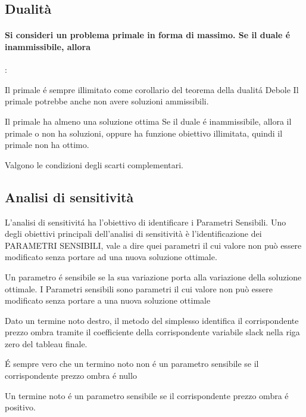 \documentclass[12pt, a4paper, openany]{book}
\begin{document}
\subsection{Dualità}

\paragraph{Si consideri un problema primale in forma di massimo. Se il duale é inammissibile, allora}:

\affermazionefalse
{Il primale é sempre illimitato come corollario del teorema della dualitá Debole}
{Il primale potrebbe anche non avere soluzioni ammissibili.}

\affermazionefalse
{Il primale ha almeno una soluzione ottima}
{Se il duale é inammissibile, allora il primale o non ha soluzioni, oppure ha funzione obiettivo illimitata, quindi il primale non ha ottimo.}

\affermazione
{Valgono le condizioni degli scarti complementari.}

\subsection{Analisi di sensitività}

\affermazionetrue
{L'analisi di sensitivitá ha l'obiettivo di identificare i Parametri Sensibili.}
{Uno degli obiettivi principali dell'analisi di sensitività è l'identificazione dei PARAMETRI SENSIBILI, vale
a dire quei parametri il cui valore non può essere modificato senza portare ad una nuova soluzione
ottimale.}

\affermazionetrue
{Un parametro é sensibile se la sua variazione porta alla variazione della soluzione ottimale.}
{I Parametri sensibili sono parametri il cui valore non può essere modificato senza portare a una nuova soluzione ottimale}

\affermazionetrue
{Dato un termine noto destro, il metodo del simplesso identifica il corrispondente prezzo ombra tramite il coefficiente
della corrispondente variabile slack nella riga zero del tableau finale.}
{}

\affermazione
{É sempre vero che un termino noto non é un parametro sensibile se il corrispondente prezzo ombra é nullo}

\affermazione
{Un termine noto é un parametro sensibile se il corrispondente prezzo ombra é positivo.}
\end{document}
